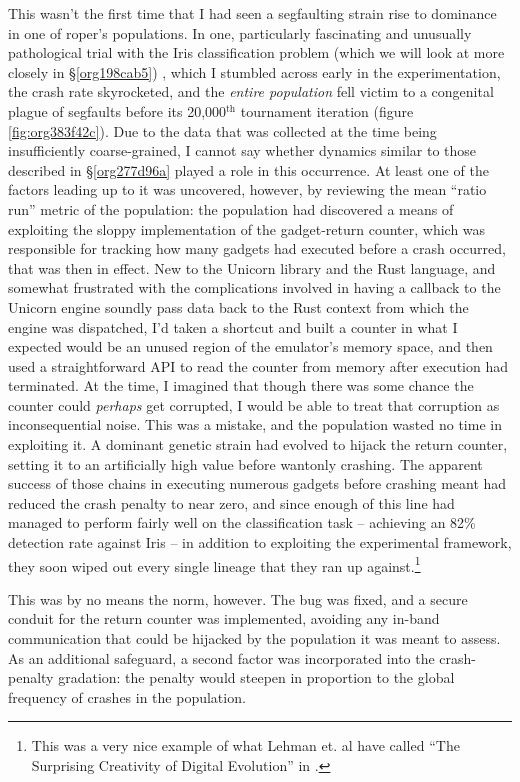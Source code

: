 \documentclass[12pt,glossary]{dalthesis}
\begin{document}
This wasn't the first time that I had seen a segfaulting strain rise to
dominance in one of \gls{roper}'s populations. In one, particularly fascinating
and unusually pathological trial with the Iris classification problem (which we
will look at more closely in \S \ref{org198cab5}) , which I stumbled
across early in the experimentation, the crash rate skyrocketed, and the \emph{entire
population} fell victim to a congenital plague of segfaults before its
20,000\(^{\text{th}}\) tournament iteration (figure \ref{fig:org383f42c}). Due to the data that
was collected at the time being insufficiently coarse-grained, I cannot say
whether dynamics similar to those described in \S \ref{org277d96a} played
a role in this occurrence. At least one of the factors leading up to it was
uncovered, however, by reviewing the mean ``ratio run'' metric of the population:
the population had discovered a means of exploiting the sloppy implementation of
the gadget-return counter, which was responsible for tracking how many gadgets
had executed before a crash occurred, that was then in effect. New to the
Unicorn library and the Rust language, and somewhat frustrated with the
complications involved in having a callback to the Unicorn engine soundly pass
data back to the Rust context from which the engine was dispatched, I'd taken a
shortcut and built a counter in what I expected would be an unused region of the
emulator's memory space, and then used a straightforward API to read the counter
from memory after execution had terminated. At the time, I imagined that though
there was some chance the counter could \emph{perhaps} get corrupted, I would be able
to treat that corruption as inconsequential noise. This was a mistake, and the
population wasted no time in exploiting it. A dominant genetic strain had
evolved to hijack the return counter, setting it to an artificially high value
before wantonly crashing. The apparent success of those chains in executing
numerous gadgets before crashing meant had reduced the crash penalty to near
zero, and since enough of this line had managed to perform fairly well on the
classification task -- achieving an 82\% detection rate against Iris -- in
addition to exploiting the experimental framework, they soon wiped out every
single lineage that they ran up against.\footnote{This was a very nice example of
what Lehman et. al have called ``The Surprising Creativity of Digital Evolution''
in \cite{lehman18}.}

This was by no means the norm, however. The bug was fixed, and a secure conduit
for the return counter was implemented, avoiding any in-band communication that
could be hijacked by the population it was meant to assess. As an additional
safeguard, a second factor was incorporated into the crash-penalty gradation:
the penalty would steepen in proportion to the global frequency of crashes in
the population. 
\end{document}
